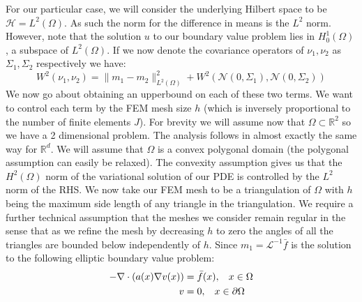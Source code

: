 For our particular case, we will consider the underlying Hilbert space to be $\mathcal{H}=L^{2}(\Omega)$. As such the norm for the difference in means is the $L^{2}$ norm. However, note that the solution $u$ to our boundary value problem lies in $H^{1}_{0}(\Omega)$, a subspace of $L^{2}(\Omega)$. %
If we now denote the covariance operators of $\nu_{1},\nu_{2}$ as $\Sigma_{1},\Sigma_{2}$ respectively we have:
\begin{equation*}
    W^{2}(\nu_1,\nu_2)=\|m_1-m_2\|_{L^{2}(\Omega)}^{2}+W^{2}(\mathcal{N}(0,\Sigma_1),\mathcal{N}(0,\Sigma_2))
\end{equation*}
We now go about obtaining an upperbound on each of these two terms. We want to control each term by the FEM mesh size $h$ (which is inversely proportional to the number of finite elements $J$). For brevity we will assume now that $\Omega\subset\mathbb{R}^{2}$ so we have a 2 dimensional problem. The analysis follows in almost exactly the same way for $\mathbb{R}^{d}$. We will assume that $\Omega$ is a convex polygonal domain (the polygonal assumption can easily be relaxed). The convexity assumption gives us that the $H^2(\Omega)$ norm of the variational solution of our PDE is controlled by the $L^2$ norm of the RHS. We now take our FEM mesh to be a triangulation of $\Omega$ with $h$ being the maximum side length of any triangle in the triangulation. We require a further technical assumption that the meshes we consider remain regular in the sense that as we refine the mesh by decreasing $h$ to zero the angles of all the triangles are bounded below independently of $h$. Since $m_1=\mathcal{L}^{-1}\bar{f}$ is the solution to the following elliptic boundary value problem:
\begin{align*}
    \begin{split}
        -\nabla\cdot(a(x)\nabla v(x))&=\bar{f}(x), \hspace{0.3cm} x\in\Omega \\
        v&=0, \hspace{0.3cm} x\in\partial\Omega
    \end{split}
\end{align*}
